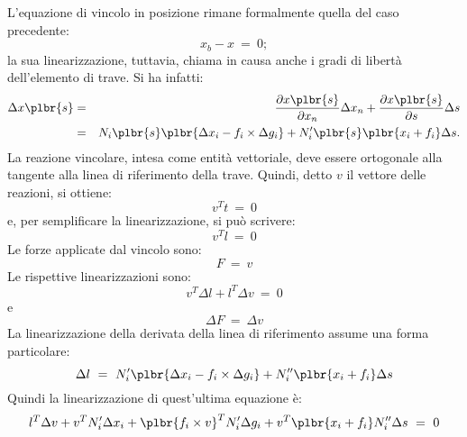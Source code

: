 \documentclass[12pt,dvips,fleqn,italian]{article}
\begin{document}
\noindent
L'equazione di vincolo in posizione rimane formalmente quella del caso
precedente:
\begin{displaymath}
    x_b - x \ = \ 0 ;
\end{displaymath}
la sua linearizzazione, tuttavia, chiama in causa anche i gradi di
libert\`{a} dell'elemento di trave.
Si ha infatti:
\begin{eqnarray*}
    \Delta{x\plbr{s}} & = &
    \frac{\partial{x\plbr{s}}}{\partial{x_n}} \Delta{x_n}
    + \frac{\partial{x\plbr{s}}}{\partial{s}} \Delta{s} \\
    & = &  
    N_i\plbr{s} \plbr{\Delta{x_i} - f_i\times\Delta{g_i}} 
    + N'_i\plbr{s} \plbr{x_i + f_i} \Delta{s} .
\end{eqnarray*}
La reazione vincolare, intesa come entit\`a vettoriale, deve essere 
ortogonale alla tangente alla linea di riferimento della trave.
Quindi, detto $ v $ il vettore delle reazioni, si ottiene:
\begin{displaymath}
    v^T t \ = \ 0
\end{displaymath}
e, per semplificare la linearizzazione, si pu\`o scrivere:
\begin{displaymath}
    v^T l \ = \ 0
\end{displaymath}
Le forze applicate dal vincolo sono:
\begin{displaymath}
    F \ = \ v
\end{displaymath}
Le rispettive linearizzazioni sono:
\begin{displaymath}
    v^T \Delta{l} + l^T \Delta{v} \ = \ 0
\end{displaymath}
e
\begin{displaymath}
    \Delta{F} \ = \ \Delta{v}
\end{displaymath}
La linearizzazione della derivata della linea di riferimento assume 
una forma particolare:
\begin{displaymath}
    \Delta{l} \ = \ N'_i\plbr{\Delta{x_i} - f_i\times\Delta{g_i}}
    + N''_i\plbr{x_i + f_i} \Delta{s}
\end{displaymath}
Quindi la linearizzazione di quest'ultima equazione \`e:
\begin{displaymath}
	l^T \Delta{v} 
	+ v^T N'_i \Delta{x_i} 
	+ \plbr{f_i\times{v}}^T N'_i \Delta{g_i}
	+ v^T \plbr{x_i + f_i} N''_i \Delta{s}
	\ = \ 0
\end{displaymath}
\end{document}
